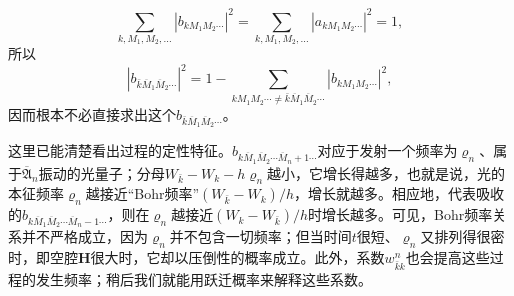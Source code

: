 \documentclass[fontsize=13pt,twoside,openany,headings=normal,parskip=false,bookmarkpackage=false,DIV=calc]{scrbook}
\begin{document}
\[
 \sum_{k,M_1,M_2,\ldots}|b_{kM_1M_2\cdots}|^2
 =\sum_{k,M_1,M_2,\ldots}|a_{kM_1M_2\cdots}|^2=1,
\]
所以
\[
 |b_{\bar k\overline M_1\overline M_2\cdots}|^2
 =1-\sum_{kM_1M_2\cdots\ne\bar k\overline M_1\overline M_2\cdots}|b_{kM_1M_2\cdots}|^2,
\]
因而根本不必直接求出这个$b_{\bar k\overline M_1\overline M_2\cdots}$。

这里已能清楚看出过程的定性特征。$b_{k\overline M_1\overline M_2\cdots\overline M_n+1\cdots}$对应于发射一个频率为$\varrho_n$、属于$\overline{\mathfrak A}_n$振动的光量子；分母$W_{\bar k}-W_k-h\varrho_n$越小，它增长得越多，也就是说，光的本征频率$\varrho_n$越接近“Bohr频率”$(W_{\bar k}-W_k)/h$，增长就越多。相应地，代表吸收的$b_{k\overline M_1\overline M_2\cdots\overline M_n-1\cdots}$，则在$\varrho_n$越接近$(W_k-W_{\bar k})/h$时增长越多。可见，Bohr频率关系并不严格成立，因为$\varrho_n$并不包含一切频率；但当时间$t$很短、$\varrho_n$又排列得很密时，即空腔$\boldsymbol H$很大时，它却以压倒性的概率成立。此外，系数$w_{\bar k k}^n$也会提高这些过程的发生频率；稍后我们就能用跃迁概率来解释这些系数。
\end{document}
